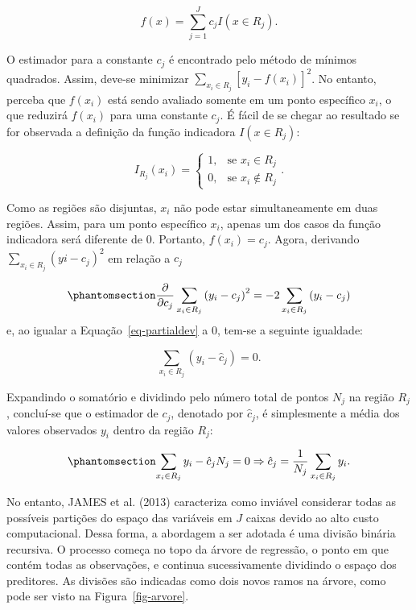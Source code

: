 \documentclass[
  12pt,
  a4paper,
]{scrreprt}
\begin{document}
\[
f\left(x\right) = \sum^J_{j=1}c_j I\left(x \in R_j \right)\text{.}
\]

O estimador para a constante \(c_j\) é encontrado pelo método de mínimos
quadrados. Assim, deve-se minimizar
\(\sum_{x_i \in R_j} \left[y_i - f\left(x_i\right)\right]^2\). No
entanto, perceba que \(f\left(x_i\right)\) está sendo avaliado somente
em um ponto específico \(x_i\), o que reduzirá \(f\left(x_i\right)\)
para uma constante \(c_j\). É fácil de se chegar ao resultado se for
observada a definição da função indicadora \(I\left(x \in R_j\right)\):

\[
I_{R_j}(x_i) =
\begin{cases}
    1,& \text{se } x_i \in R_j \\
    0,& \text{se } x_i \notin R_j
\end{cases}\text{.}
\]

Como as regiões são disjuntas, \(x_i\) não pode estar simultaneamente em
duas regiões. Assim, para um ponto específico \(x_i\), apenas um dos
casos da função indicadora será diferente de 0. Portanto,
\(f\left(x_i\right) = c_j\). Agora, derivando
\(\sum_{x_i \in R_j}\left(yi - c_j\right)^2\) em relação a \(c_j\)

\begin{equation}\phantomsection\label{eq-partialdev}{
\frac{\partial}{\partial{c_j}}\sum_{x_i \in R_j} \left(y_i - c_j\right)^2 = -2\sum_{x_i \in R_j} \left(y_i - c_j\right)
}\end{equation} e, ao igualar a Equação~\ref{eq-partialdev} a 0, tem-se
a seguinte igualdade:

\[
\sum_{x_i \in R_j} \left(y_i - \hat{c}_j\right) = 0\text{.}
\]

Expandindo o somatório e dividindo pelo número total de pontos \(N_j\)
na região \(R_j\), concluí-se que o estimador de \(c_j\), denotado por
\(\hat{c}_j\), é simplesmente a média dos valores observados \(y_i\)
dentro da região \(R_j\):

\begin{equation}\phantomsection\label{eq-estimacjdev}{
\sum_{x_i \in R_j} y_i - \hat{c}_j N_j = 0 \Rightarrow \hat{c}_j = \frac{1}{N_{j}}\sum_{x_i \in R_j} y_i\text{.}
}\end{equation}

\vspace{12pt}

No entanto, JAMES et al. (2013) caracteriza como inviável considerar
todas as possíveis partições do espaço das variáveis em \(J\) caixas
devido ao alto custo computacional. Dessa forma, a abordagem a ser
adotada é uma divisão binária recursiva. O processo começa no topo da
árvore de regressão, o ponto em que contém todas as observações, e
continua sucessivamente dividindo o espaço dos preditores. As divisões
são indicadas como dois novos ramos na árvore, como pode ser visto na
Figura~\ref{fig-arvore}.
\end{document}
